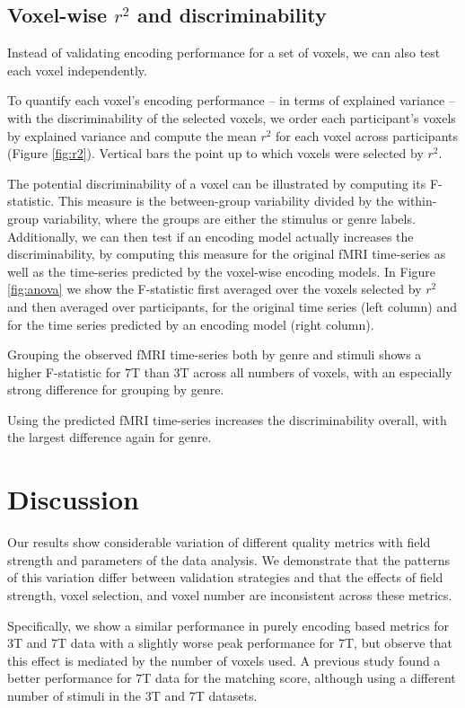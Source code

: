 \subsection*{Voxel-wise $r^2$ and discriminability}
%
Instead of validating encoding performance for a set of voxels, we can also test
each voxel independently.

To quantify each voxel's encoding performance -- in terms of explained
variance -- with the discriminability of the selected voxels, we order each
participant's voxels by explained variance and compute the mean $r^2$ for each
voxel across participants (Figure \ref{fig:r2}). Vertical bars the point up to
which voxels were selected by $r^2$. 

The potential discriminability of a voxel can be illustrated by computing its
F-statistic. This measure is the between-group variability divided by the within-group
variability, where the groups are either the stimulus or genre labels. 
Additionally, we can then test if an encoding model actually increases the
discriminability, by computing this measure for the original f{MRI} time-series as well
as the time-series predicted by the voxel-wise encoding models. In Figure
\ref{fig:anova} we show the F-statistic first averaged over the
voxels selected by $r^2$ and then averaged over participants, for the original
time series (left column) and for the time series predicted by an encoding model
(right column).

Grouping the observed f{MRI} time-series both by genre and stimuli shows a
higher F-statistic for 7T than 3T across all numbers of voxels, with an
especially strong difference for grouping by genre.

Using the predicted f{MRI} time-series increases the discriminability overall,
with the largest difference again for genre.

\section*{Discussion}

Our results show considerable variation of different quality metrics with
field strength and parameters of the data analysis. We demonstrate that the
patterns of this variation differ between validation strategies and that the
effects of field strength, voxel selection, and voxel number are inconsistent
across these metrics.

Specifically, we show a similar performance in purely encoding based metrics
for 3T and 7T data with a slightly worse peak performance for 7T, but
observe that this effect is mediated by the number of voxels used. A previous
study \citep{SF14} found a better performance for 7T data for the matching
score, although using a different number of stimuli in the 3T and 7T
datasets. 

